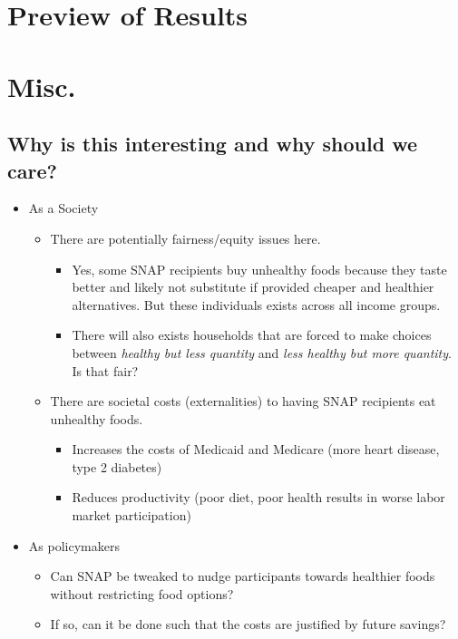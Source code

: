 \documentclass[11pt,letterpaper,]{book}
\providecommand{\tightlist}{%
  \setlength{\itemsep}{0pt}\setlength{\parskip}{0pt}}
\begin{document}
\section{Preview of Results}\label{preview-of-results}

\section{Misc.}\label{misc.}

\subsection{Why is this interesting and why should we
care?}\label{why-is-this-interesting-and-why-should-we-care}

\begin{itemize}
\tightlist
\item
  As a Society

  \begin{itemize}
  \tightlist
  \item
    There are potentially fairness/equity issues here.

    \begin{itemize}
    \tightlist
    \item
      Yes, some SNAP recipients buy unhealthy foods because they taste
      better and likely not substitute if provided cheaper and healthier
      alternatives. But these individuals exists across all income
      groups.
    \item
      There will also exists households that are forced to make choices
      between \emph{healthy but less quantity} and \emph{less healthy
      but more quantity}. Is that fair?
    \end{itemize}
  \item
    There are societal costs (externalities) to having SNAP recipients
    eat unhealthy foods.

    \begin{itemize}
    \tightlist
    \item
      Increases the costs of Medicaid and Medicare (more heart disease,
      type 2 diabetes)
    \item
      Reduces productivity (poor diet, poor health results in worse
      labor market participation)
    \end{itemize}
  \end{itemize}
\item
  As policymakers

  \begin{itemize}
  \tightlist
  \item
    Can SNAP be tweaked to nudge participants towards healthier foods
    without restricting food options?
  \item
    If so, can it be done such that the costs are justified by future
    savings?
  \end{itemize}
\end{itemize}
\end{document}
